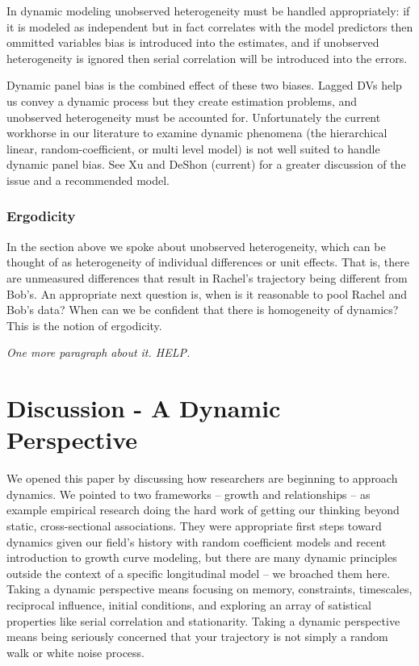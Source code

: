 \documentclass[english,,man]{apa6}
\theoremstyle{definition}
\theoremstyle{definition}
\theoremstyle{definition}
\theoremstyle{remark}
\begin{document}
In dynamic modeling unobserved heterogeneity must be handled
appropriately: if it is modeled as independent but in fact correlates
with the model predictors then ommitted variables bias is introduced
into the estimates, and if unobserved heterogeneity is ignored then
serial correlation will be introduced into the errors.

Dynamic panel bias is the combined effect of these two biases. Lagged
DVs help us convey a dynamic process but they create estimation
problems, and unobserved heterogeneity must be accounted for.
Unfortunately the current workhorse in our literature to examine dynamic
phenomena (the hierarchical linear, random-coefficient, or multi level
model) is not well suited to handle dynamic panel bias. See Xu and
DeShon (current) for a greater discussion of the issue and a recommended
model.

\hypertarget{ergodicity}{%
\subsubsection{Ergodicity}\label{ergodicity}}

In the section above we spoke about unobserved heterogeneity, which can
be thought of as heterogeneity of individual differences or unit
effects. That is, there are unmeasured differences that result in
Rachel's trajectory being different from Bob's. An appropriate next
question is, when is it reasonable to pool Rachel and Bob's data? When
can we be confident that there is homogeneity of dynamics? This is the
notion of ergodicity.

\emph{One more paragraph about it. HELP.}

\hypertarget{discussion---a-dynamic-perspective}{%
\section{Discussion - A Dynamic
Perspective}\label{discussion---a-dynamic-perspective}}

We opened this paper by discussing how researchers are beginning to
approach dynamics. We pointed to two frameworks -- growth and
relationships -- as example empirical research doing the hard work of
getting our thinking beyond static, cross-sectional associations. They
were appropriate first steps toward dynamics given our field's history
with random coefficient models and recent introduction to growth curve
modeling, but there are many dynamic principles outside the context of a
specific longitudinal model -- we broached them here. Taking a dynamic
perspective means focusing on memory, constraints, timescales,
reciprocal influence, initial conditions, and exploring an array of
satistical properties like serial correlation and stationarity. Taking a
dynamic perspective means being seriously concerned that your trajectory
is not simply a random walk or white noise process.
\end{document}
